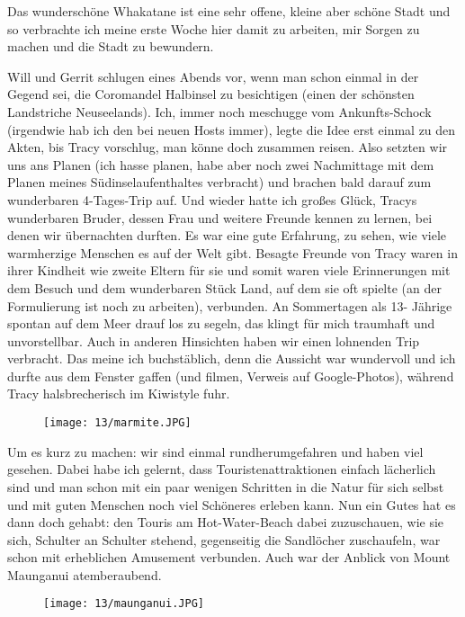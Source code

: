 Das wunderschöne Whakatane ist eine sehr offene, kleine aber schöne
Stadt und so verbrachte ich meine erste Woche hier damit zu arbeiten,
mir Sorgen zu machen und die Stadt zu bewundern.

Will und Gerrit schlugen eines Abends vor, wenn man schon einmal in
der Gegend sei, die Coromandel Halbinsel zu besichtigen (einen der
schönsten Landstriche Neuseelands). Ich, immer noch meschugge vom
Ankunfts-Schock (irgendwie hab ich den bei neuen Hosts immer), legte
die Idee erst einmal zu den Akten, bis Tracy vorschlug, man könne doch
zusammen reisen. Also setzten wir uns ans Planen (ich hasse planen,
habe aber noch zwei Nachmittage mit dem Planen meines
Südinselaufenthaltes verbracht) und brachen bald darauf zum
wunderbaren 4-Tages-Trip auf. Und wieder hatte ich großes Glück,
Tracys wunderbaren Bruder, dessen Frau und weitere Freunde kennen zu
lernen, bei denen wir übernachten durften. Es war eine gute Erfahrung,
zu sehen, wie viele warmherzige Menschen es auf der Welt gibt. Besagte
Freunde von Tracy waren in ihrer Kindheit wie zweite Eltern für sie
und somit waren viele Erinnerungen mit dem Besuch und dem wunderbaren
Stück Land, auf dem sie oft spielte (an der Formulierung ist noch zu
arbeiten), verbunden. An Sommertagen als 13- Jährige spontan auf dem
Meer drauf los zu segeln, das klingt für mich traumhaft und
unvorstellbar. Auch in anderen Hinsichten haben wir einen lohnenden
Trip verbracht. Das meine ich buchstäblich, denn die Aussicht war
wundervoll und ich durfte aus dem Fenster gaffen (und filmen, Verweis
auf Google-Photos), während Tracy halsbrecherisch im Kiwistyle
fuhr.
\begin{figure}[h]
  \centering
  \texttt{[image: 13/marmite.JPG]}
\end{figure}

Um es kurz zu machen: wir sind einmal rundherumgefahren und haben viel
gesehen. Dabei habe ich gelernt, dass Touristenattraktionen einfach
lächerlich sind und man schon mit ein paar wenigen Schritten in die
Natur für sich selbst und mit guten Menschen noch viel Schöneres
erleben kann. Nun ein Gutes hat es dann doch gehabt: den Touris am
Hot-Water-Beach dabei zuzuschauen, wie sie sich, Schulter an Schulter
stehend, gegenseitig die Sandlöcher zuschaufeln, war schon mit
erheblichen Amusement verbunden. Auch war der Anblick von Mount
Maunganui atemberaubend.
\begin{figure}[h]
  \centering
  \texttt{[image: 13/maunganui.JPG]}
\end{figure}

